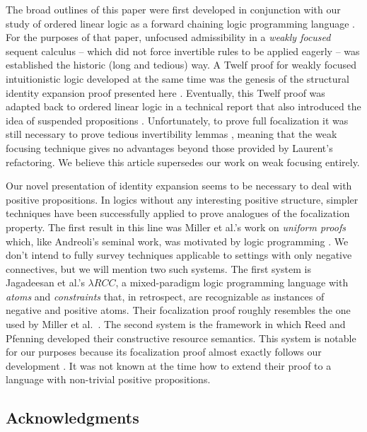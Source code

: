 \documentclass[acmtocl]{robtrans}\pdfoutput=1
\begin{document}
The broad outlines of this paper were first developed in conjunction
with our study of ordered linear logic as a forward chaining logic
programming language \cite{pfenning09substructural}. For the purposes
of that paper, unfocused admissibility in a {\it weakly focused}
sequent calculus -- which did not force invertible rules to be applied
eagerly -- was established the historic (long and tedious) way. A
Twelf proof for weakly focused intuitionistic logic developed at the
same time was the genesis of the structural identity expansion proof
presented here \cite{simmons09weak}.  Eventually, this Twelf proof was
adapted back to ordered linear logic in a technical report that also
introduced the idea of suspended propositions
\cite{simmons11weak}. Unfortunately, to prove full focalization it was
still necessary to prove tedious invertibility lemmas
\cite{simmons11logical}, meaning that the weak focusing technique
gives no advantages beyond those provided by Laurent's refactoring. We
believe this article supersedes our work on weak focusing
entirely. 



Our novel presentation of identity expansion seems to be necessary to
deal with positive propositions. In logics without any interesting
positive structure, simpler techniques have been successfully applied
to prove analogues of the focalization property. The first result in
this line was Miller et al.'s work on {\it uniform proofs} which, like
Andreoli's seminal work, was motivated by logic programming
\cite{miller91uniform}.  We don't intend to fully survey techniques
applicable to settings with only negative connectives, but we will
mention two such systems.  The first system is Jagadeesan et al.'s
$\lambda RCC$, a mixed-paradigm logic programming language with {\it
  atoms} and {\it constraints} that, in retrospect, 
are recognizable as instances of 
negative and positive atoms.
Their focalization proof roughly
resembles the one used by Miller et
al.~\cite{jagadeesan05testing}. The second system is the framework in
which Reed and Pfenning developed their constructive resource
semantics. This system is notable for our purposes because its
focalization proof almost exactly follows our development
\cite{reed10focus}. It was not known at the time how to extend their
proof to a language with non-trivial positive propositions.

\subsection*{Acknowledgments}
\end{document}
